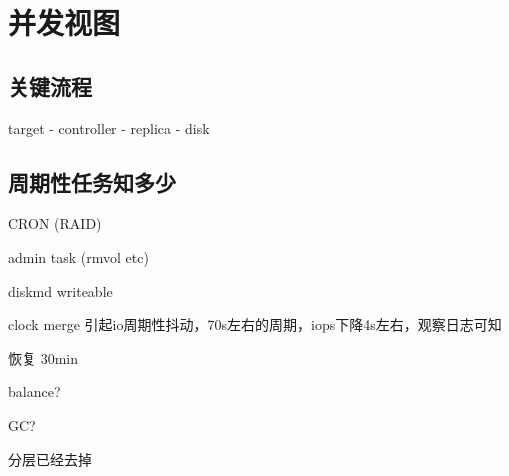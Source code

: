 \chapter{并发视图}

\section{关键流程}

target - controller - replica - disk

\section{周期性任务知多少}

\begin{enumbox}
\item CRON (RAID)
\item admin task (rmvol etc)
\item diskmd writeable
\item clock merge 引起io周期性抖动，70s左右的周期，iops下降4s左右，观察日志可知
\item 恢复 30min
\item balance?
\item GC?
\item 分层已经去掉
\end{enumbox}
